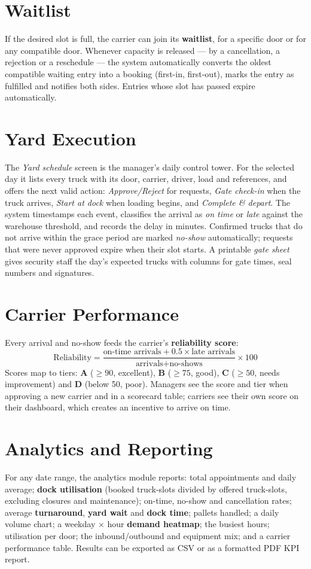\section{Waitlist}
If the desired slot is full, the carrier can join its \textbf{waitlist}, for a specific door or for any compatible door. Whenever capacity is released --- by a cancellation, a rejection or a reschedule --- the system automatically converts the oldest compatible waiting entry into a booking (first-in, first-out), marks the entry as fulfilled and notifies both sides. Entries whose slot has passed expire automatically.

\section{Yard Execution}
The \emph{Yard schedule} screen is the manager's daily control tower. For the selected day it lists every truck with its door, carrier, driver, load and references, and offers the next valid action: \emph{Approve/Reject} for requests, \emph{Gate check-in} when the truck arrives, \emph{Start at dock} when loading begins, and \emph{Complete \& depart}. The system timestamps each event, classifies the arrival as \emph{on time} or \emph{late} against the warehouse threshold, and records the delay in minutes. Confirmed trucks that do not arrive within the grace period are marked \emph{no-show} automatically; requests that were never approved expire when their slot starts. A printable \emph{gate sheet} gives security staff the day's expected trucks with columns for gate times, seal numbers and signatures.

\section{Carrier Performance}
Every arrival and no-show feeds the carrier's \textbf{reliability score}:
\begin{equation}
\text{Reliability} = \frac{\text{on-time arrivals} + 0.5\times\text{late arrivals}}{\text{arrivals} + \text{no-shows}}\times 100
\end{equation}
Scores map to tiers: \textbf{A} ($\geq 90$, excellent), \textbf{B} ($\geq 75$, good), \textbf{C} ($\geq 50$, needs improvement) and \textbf{D} (below 50, poor). Managers see the score and tier when approving a new carrier and in a scorecard table; carriers see their own score on their dashboard, which creates an incentive to arrive on time.

\section{Analytics and Reporting}
For any date range, the analytics module reports: total appointments and daily average; \textbf{dock utilisation} (booked truck-slots divided by offered truck-slots, excluding closures and maintenance); on-time, no-show and cancellation rates; average \textbf{turnaround}, \textbf{yard wait} and \textbf{dock time}; pallets handled; a daily volume chart; a weekday $\times$ hour \textbf{demand heatmap}; the busiest hours; utilisation per door; the inbound/outbound and equipment mix; and a carrier performance table. Results can be exported as CSV or as a formatted PDF KPI report.

